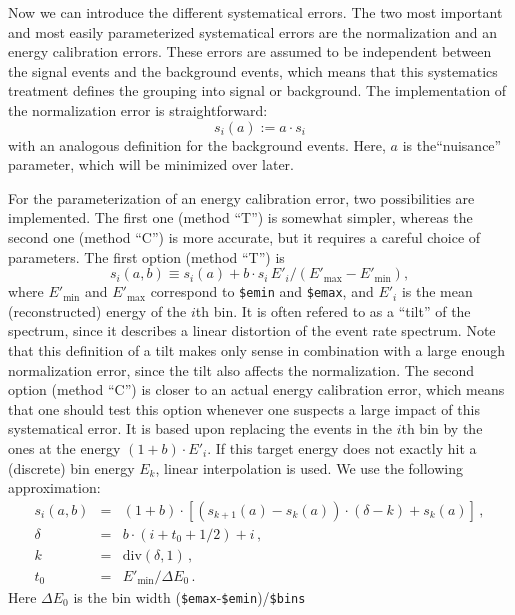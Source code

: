 Now we can introduce the different systematical errors. 
The two most important and
most easily parameterized systematical errors are the normalization 
and an energy calibration errors. These errors are assumed to be independent between the signal events and the background events, which means that
this systematics treatment defines the grouping into signal or background.
The implementation of the normalization error
is straightforward:
\begin{equation}
s_i(a):=a\cdot s_i
\end{equation} 
with an analogous definition for the background events. Here, $a$ is the``nuisance'' parameter, which will be minimized over later.

For the parameterization of an energy calibration error, two possibilities
are implemented. The first one (method ``T'') is somewhat simpler, 
whereas the second one (method ``C'')
is more accurate, but it requires a careful choice of parameters. 
The first option (method ``T'') is
\begin{equation}
s_i(a,b) \equiv s_i(a)+b\cdot s_i\, E'_i/(E'_\mathrm{max}-E'_\mathrm{min}),
\end{equation}
where $E'_{\mathrm{min}}$ and $E'_{\mathrm{max}}$ correspond to {\tt \$emin}
and {\tt \$emax}, and $E'_i$ is the mean (reconstructed) 
energy of the $i$th bin. It is often refered to as a ``tilt'' of the
spectrum, since it describes a linear distortion 
of the event rate spectrum. Note that this definition of a tilt makes
only sense in combination with a large enough normalization error, since
the tilt also affects the normalization.
%
The second option (method ``C'') is closer to an actual energy
calibration error, which means that one should test this option whenever
one suspects a large impact of this systematical error.
It is based upon replacing the events in the $i$th bin by the ones at
the energy $(1+b)\cdot E'_i$. If this target energy does not exactly hit
a (discrete) bin energy $E_k$, linear interpolation is used. We use the following approximation:
\begin{eqnarray}
s_i(a,b)&=& (1+b)\cdot \left[ \left( s_{k+1}(a)-s_k(a) \right)\cdot (\delta-k) +s_k(a) \right] \,,\\
\delta&=&b\cdot(i+t_0+ 1/2)+i\,,\nonumber\\
k&=& \mathrm{div}(\delta,1)\,,\nonumber\\
t_0&=&E'_\mathrm{min}/\Delta E_0\,.\nonumber
\end{eqnarray}
Here $\Delta E_0$ is the bin width ({\tt \$emax}-{\tt \$emin})/{\tt \$bins}
